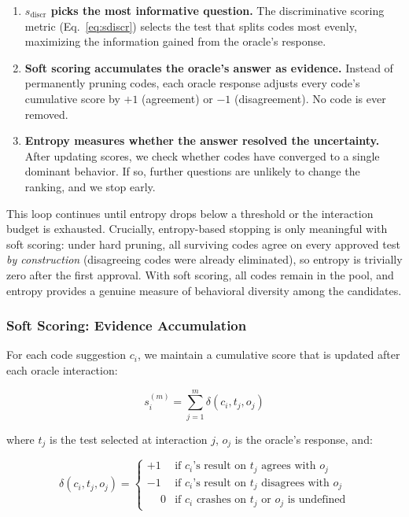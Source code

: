 \documentclass[conference]{IEEEtran}
\begin{document}
\begin{enumerate}
    \item \textbf{$s_{\text{discr}}$ picks the most informative question.} The discriminative scoring metric (Eq.~\ref{eq:sdiscr}) selects the test that splits codes most evenly, maximizing the information gained from the oracle's response.
    \item \textbf{Soft scoring accumulates the oracle's answer as evidence.} Instead of permanently pruning codes, each oracle response adjusts every code's cumulative score by $+1$ (agreement) or $-1$ (disagreement). No code is ever removed.
    \item \textbf{Entropy measures whether the answer resolved the uncertainty.} After updating scores, we check whether codes have converged to a single dominant behavior. If so, further questions are unlikely to change the ranking, and we stop early.
\end{enumerate}

This loop continues until entropy drops below a threshold or the interaction budget is exhausted. Crucially, entropy-based stopping is only meaningful with soft scoring: under hard pruning, all surviving codes agree on every approved test \emph{by construction} (disagreeing codes were already eliminated), so entropy is trivially zero after the first approval. With soft scoring, all codes remain in the pool, and entropy provides a genuine measure of behavioral diversity among the candidates.

\subsubsection{Soft Scoring: Evidence Accumulation}

For each code suggestion $c_i$, we maintain a cumulative score that is updated after each oracle interaction:

\begin{equation}
    s_i^{(m)} = \sum_{j=1}^{m} \delta(c_i, t_j, o_j)
\end{equation}

where $t_j$ is the test selected at interaction $j$, $o_j$ is the oracle's response, and:

\begin{equation}
    \delta(c_i, t_j, o_j) = \begin{cases}
        +1 & \text{if } c_i \text{'s result on } t_j \text{ agrees with } o_j \\
        -1 & \text{if } c_i \text{'s result on } t_j \text{ disagrees with } o_j \\
        \phantom{+}0 & \text{if } c_i \text{ crashes on } t_j \text{ or } o_j \text{ is undefined}
    \end{cases}
\end{equation}
\end{document}
